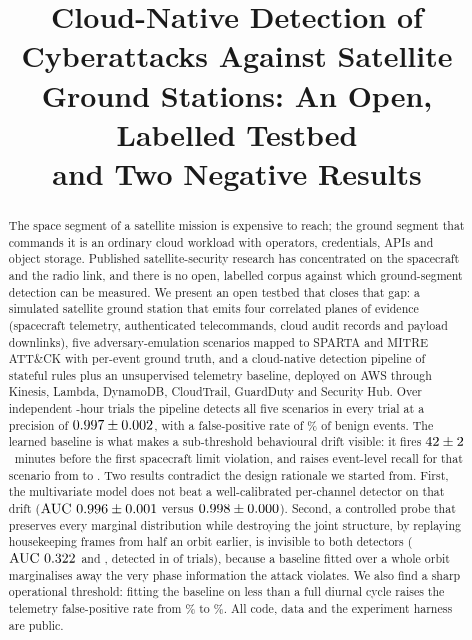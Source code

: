 \documentclass[conference]{IEEEtran}
\begin{document}
\title{Cloud-Native Detection of Cyberattacks Against Satellite\\
Ground Stations: An Open, Labelled Testbed\\ and Two Negative Results}

\author{
}

\maketitle

\begin{abstract}
The space segment of a satellite mission is expensive to reach; the ground
segment that commands it is an ordinary cloud workload with operators,
credentials, APIs and object storage. Published satellite-security research has
concentrated on the spacecraft and the radio link, and there is no open,
labelled corpus against which ground-segment detection can be measured. We
present an open testbed that closes that gap: a simulated satellite ground
station that emits four correlated planes of evidence (spacecraft telemetry,
authenticated telecommands, cloud audit records and payload downlinks), five
adversary-emulation scenarios mapped to SPARTA and MITRE ATT\&CK with
per-event ground truth, and a cloud-native detection pipeline of
\expRuleCount{} stateful rules plus an unsupervised telemetry baseline, deployed
on AWS through Kinesis, Lambda, DynamoDB, CloudTrail, GuardDuty and Security
Hub. Over \expNumSeeds{} independent \expSimHours-hour trials the pipeline
detects all five scenarios in every trial at a precision of
$0.997 \pm 0.002$, with a false-positive rate of
\expFprOverall\% of benign events. The learned baseline is what makes a
sub-threshold behavioural drift visible: it fires
$42 \pm 2$~minutes before the first spacecraft limit
violation, and raises event-level recall for that scenario from
\expRecAnomalyRules{} to \expRecAnomalousBehavior{}. Two results contradict the
design rationale we started from. First, the multivariate model does not beat a
well-calibrated per-channel detector on that drift
($\mathrm{AUC}\ 0.996 \pm 0.001$ versus
$0.998 \pm 0.000$). Second, a controlled probe that preserves every
marginal distribution while destroying the joint structure, by replaying
housekeeping frames from half an orbit earlier, is invisible to both
detectors ($\mathrm{AUC}\ \expAucSwapMulti$ and \expAucSwapUni{}, detected in
\expSwapDetectedMulti{} of \expNumSeeds{} trials), because a baseline fitted
over a whole orbit marginalises away the very phase information the attack
violates. We also find a sharp operational threshold: fitting the baseline on
less than a full diurnal cycle raises the telemetry false-positive rate from
\expFprFullDay\% to \expFprOneHour\%. All code, data and the experiment harness
are public.
\end{abstract}
\end{document}
